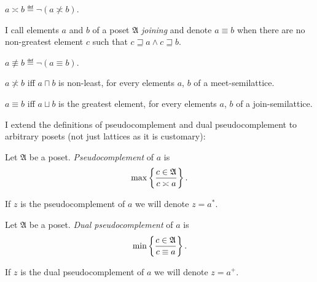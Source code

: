 \begin{defn}
$a\asymp b\eqdef\lnot(a\nasymp b)$.
\end{defn}

\begin{defn}
I call elements $a$ and $b$ of a poset $\mathfrak{A}$ \emph{joining}
and denote $a\equiv b$ when there are no non-greatest element $c$
such that $c\sqsupseteq a\land c\sqsupseteq b$.
\end{defn}

\begin{defn}
$a\nequiv b\eqdef\lnot(a\equiv b)$.\end{defn}
\begin{obvious}
$a\nasymp b$ iff $a\sqcap b$ is non-least, for every elements $a$,
$b$ of a meet-semilattice.
\end{obvious}

\begin{obvious}
$a\equiv b$ iff $a\sqcup b$ is the greatest element, for every elements
$a$, $b$ of a join-semilattice.
\end{obvious}
I extend the definitions of pseudocomplement and dual pseudocomplement
to arbitrary posets (not just lattices as it is customary):
\begin{defn}
Let $\mathfrak{A}$ be a poset. \emph{Pseudocomplement} of $a$ is
\[
\max\left\{ \frac{c\in\mathfrak{A}}{c\asymp a}\right\}.
\]


If $z$ is the pseudocomplement of $a$ we will denote $z=a^{\ast}$.
\end{defn}

\begin{defn}
Let $\mathfrak{A}$ be a poset. \emph{Dual pseudocomplement} of $a$
is
\[
\min\left\{ \frac{c\in\mathfrak{A}}{c\equiv a}\right\}.
\]


If $z$ is the dual pseudocomplement of $a$ we will denote $z=a^{+}$.\end{defn}

